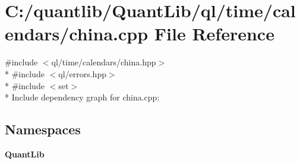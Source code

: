 \section{C\+:/quantlib/\+Quant\+Lib/ql/time/calendars/china.cpp File Reference}
\label{china_8cpp}
{\ttfamily \#include $<$ql/time/calendars/china.\+hpp$>$}\\*
{\ttfamily \#include $<$ql/errors.\+hpp$>$}\\*
{\ttfamily \#include $<$set$>$}\\*
Include dependency graph for china.\+cpp\+:
\subsection*{Namespaces}
\begin{DoxyCompactItemize}
\item 
 {\bf Quant\+Lib}
\end{DoxyCompactItemize}
